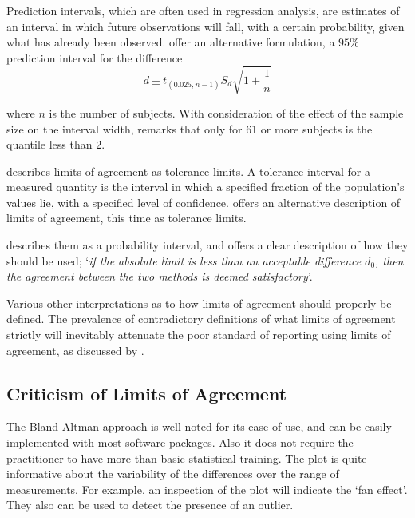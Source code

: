 \documentclass[12pt, a4paper]{report}
\theoremstyle{plain}
\theoremstyle{definition}
\theoremstyle{remark}
\begin{document}
Prediction intervals, which are often used in regression analysis, are estimates of an interval in which future
observations will fall, with a certain probability, given what has already been observed. \citet{BXC2008} offer an alternative
formulation, a $95\%$ prediction interval for the difference
\begin{equation}
\bar{d} \pm t_{(0.025, n-1)}S_{d} \sqrt{1+\frac{1}{n}}
\end{equation}

 where $n$ is the number of subjects. With consideration of the effect of the sample size on the interval
width, \citet{BXC2008} remarks that only for 61 or more subjects is the quantile less than 2.

\citet{luiz} describes limits of agreement as tolerance limits. A
tolerance interval for a measured quantity is the interval in
which a specified fraction of the population's values lie, with a
specified level of confidence. \citet{luiz} offers an alternative description of limits of agreement, this time as tolerance limits. 

\citet{Barnhart} describes them as a probability interval, and offers a clear description of how they should be used; `\textit{if the absolute limit is less than an acceptable difference $d_{0}$, then the agreement between the two methods is deemed satisfactory}'.

Various other interpretations as to how limits of agreement should properly be defined. The prevalence of contradictory definitions of what limits of agreement strictly will inevitably attenuate the poor standard of reporting using limits of agreement, as discussed by \citet{mantha}.



\subsection{Criticism of Limits of Agreement }
The Bland-Altman approach is well noted for its ease of use, and can be easily implemented with most software packages. Also it does not require the practitioner to have more than basic statistical training. The plot is quite informative about the variability of the differences over the range of measurements. For
example, an inspection of the plot will indicate the `fan effect'. They also can be used to detect the presence of an outlier.
\end{document}
